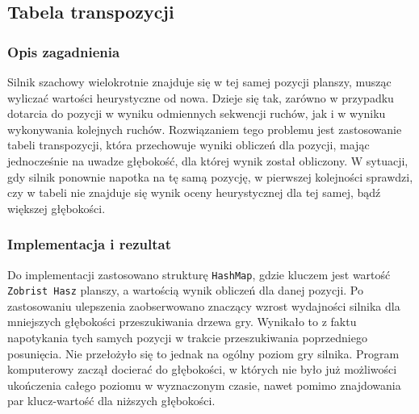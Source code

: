 \subsection{Tabela transpozycji}
\label{subsec:tabela-transpozycji}

\subsubsection{Opis zagadnienia}
Silnik szachowy wielokrotnie znajduje się w tej samej pozycji planszy, musząc wyliczać wartości heurystyczne od nowa.
Dzieje się tak, zarówno w przypadku dotarcia do pozycji w wyniku odmiennych sekwencji ruchów, jak i w wyniku wykonywania kolejnych ruchów.
Rozwiązaniem tego problemu jest zastosowanie tabeli transpozycji, która przechowuje wyniki obliczeń dla pozycji, mając jednocześnie na uwadze głębokość, dla której wynik został obliczony.
W sytuacji, gdy silnik ponownie napotka na tę samą pozycję, w pierwszej kolejności sprawdzi, czy w tabeli nie znajduje się wynik oceny heurystycznej dla tej samej, bądź większej głębokości.

\subsubsection{Implementacja i rezultat}
Do implementacji zastosowano strukturę \texttt{HashMap}, gdzie kluczem jest wartość \texttt{Zobrist Hasz} planszy, a wartością wynik obliczeń dla danej pozycji.
Po zastosowaniu ulepszenia zaobserwowano znaczący wzrost wydajności silnika dla mniejszych głębokości przeszukiwania drzewa gry.
Wynikało to z faktu napotykania tych samych pozycji w trakcie przeszukiwania poprzedniego posunięcia.
Nie przełożyło się to jednak na ogólny poziom gry silnika.
Program komputerowy zaczął docierać do głębokości, w których nie było już możliwości ukończenia całego poziomu w wyznaczonym czasie, nawet pomimo znajdowania par klucz-wartość dla niższych głębokości.
